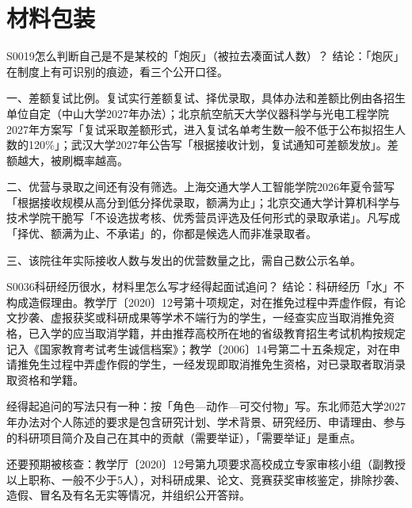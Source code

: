 \section{材料包装}
\begin{qa}{S0019}{怎么判断自己是不是某校的「炮灰」（被拉去凑面试人数）？}
结论：「炮灰」在制度上有可识别的痕迹，看三个公开口径。

一、差额复试比例。复试实行差额复试、择优录取，具体办法和差额比例由各招生单位自定（中山大学2027年办法）；北京航空航天大学仪器科学与光电工程学院2027年方案写「复试采取差额形式，进入复试名单考生数一般不低于公布拟招生人数的120\%」；武汉大学2027年公告写「根据接收计划，复试通知可差额发放」。差额越大，被刷概率越高。

二、优营与录取之间还有没有筛选。上海交通大学人工智能学院2026年夏令营写「根据接收规模从高分到低分择优录取，额满为止」；北京交通大学计算机科学与技术学院干脆写「不设选拔考核、优秀营员评选及任何形式的录取承诺」。凡写成「择优、额满为止、不承诺」的，你都是候选人而非准录取者。

三、该院往年实际接收人数与发出的优营数量之比，需自己数公示名单。
\end{qa}

\begin{qa}{S0036}{科研经历很水，材料里怎么写才经得起面试追问？}
结论：科研经历「水」不构成造假理由。教学厅〔2020〕12号第十项规定，对在推免过程中弄虚作假，有论文抄袭、虚报获奖或科研成果等学术不端行为的学生，一经查实应当取消推免资格，已入学的应当取消学籍，并由推荐高校所在地的省级教育招生考试机构按规定记入《国家教育考试考生诚信档案》；教学〔2006〕14号第二十五条规定，对在申请推免生过程中弄虚作假的学生，一经发现即取消推免生资格，对已录取者取消录取资格和学籍。

经得起追问的写法只有一种：按「角色—动作—可交付物」写。东北师范大学2027年办法对个人陈述的要求是包含研究计划、学术背景、研究经历、申请理由、参与的科研项目简介及自己在其中的贡献（需要举证），「需要举证」是重点。

还要预期被核查：教学厅〔2020〕12号第九项要求高校成立专家审核小组（副教授以上职称、一般不少于5人），对科研成果、论文、竞赛获奖审核鉴定，排除抄袭、造假、冒名及有名无实等情况，并组织公开答辩。
\end{qa}

